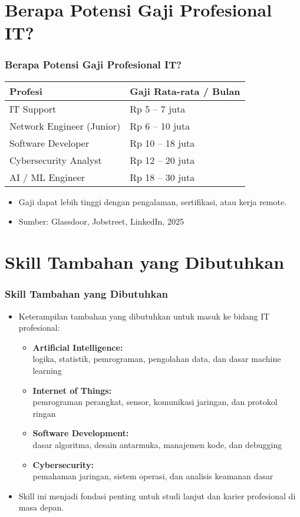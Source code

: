 \documentclass[aspectratio=169, table]{beamer}
\begin{document}
\section{Berapa Potensi Gaji Profesional IT?}
\begin{frame}
	\frametitle{Berapa Potensi Gaji Profesional IT?}
	\vspace{10pt}
	\begin{table}[]
		\centering
		\begin{tabular}{|l|l|}
			\hline
			\textbf{Profesi} & \textbf{Gaji Rata-rata / Bulan} \\
			\hline
			IT Support & Rp 5 – 7 juta \\
			Network Engineer (Junior) & Rp 6 – 10 juta \\
			Software Developer & Rp 10 – 18 juta \\
			Cybersecurity Analyst & Rp 12 – 20 juta \\
			AI / ML Engineer & Rp 18 – 30 juta \\
			\hline
		\end{tabular}
	\end{table}
	\vspace{10pt}
	\begin{itemize}
		\item Gaji dapat lebih tinggi dengan pengalaman, sertifikasi, atau kerja remote.
		\item Sumber: Glassdoor, Jobstreet, LinkedIn, 2025
	\end{itemize}
\end{frame}

\section{Skill Tambahan yang Dibutuhkan}
\begin{frame}
	\frametitle{Skill Tambahan yang Dibutuhkan}
	\vspace{10pt}
	\begin{itemize}
		\item Keterampilan tambahan yang dibutuhkan untuk masuk ke bidang IT profesional:
		\begin{itemize}
			\item \textbf{Artificial Intelligence:} \\
			logika, statistik, pemrograman, pengolahan data, dan dasar machine learning
			\item \textbf{Internet of Things:} \\
			pemrograman perangkat, sensor, komunikasi jaringan, dan protokol ringan
			\item \textbf{Software Development:} \\
			dasar algoritma, desain antarmuka, manajemen kode, dan debugging
			\item \textbf{Cybersecurity:} \\
			pemahaman jaringan, sistem operasi, dan analisis keamanan dasar
		\end{itemize}
		\item Skill ini menjadi fondasi penting untuk studi lanjut dan karier profesional di masa depan.
	\end{itemize}
\end{frame}
\end{document}
